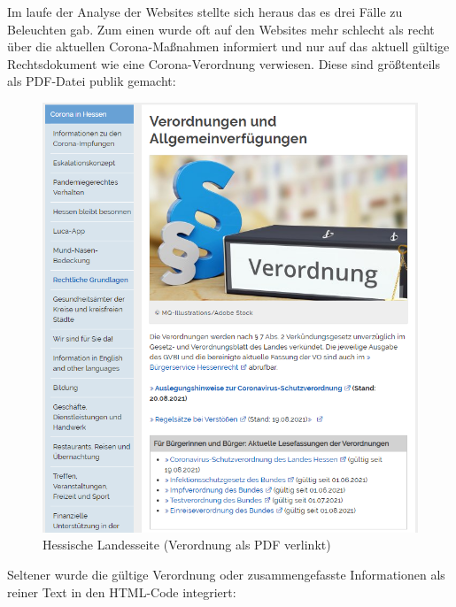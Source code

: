 \documentclass[12pt,oneside,a4paper,parskip]{scrbook}
\begin{document}
Im laufe der Analyse der Websites stellte sich heraus das es drei Fälle zu Beleuchten gab. Zum einen wurde oft auf den Websites mehr schlecht als recht über die aktuellen Corona-Maßnahmen informiert und nur auf das aktuell gültige Rechtsdokument wie eine Corona-Verordnung verwiesen. Diese sind größtenteils als PDF-Datei publik gemacht:
\begin{figure}[H]
	\caption{Hessische Landesseite (Verordnung als PDF verlinkt)}
	\label{websiteHessen}
	\centering
	\includegraphics[scale=0.9]{pictures/hessenOverview.png}
\end{figure}

Seltener wurde die gültige Verordnung oder zusammengefasste Informationen als reiner Text in den HTML-Code integriert:
\end{document}
